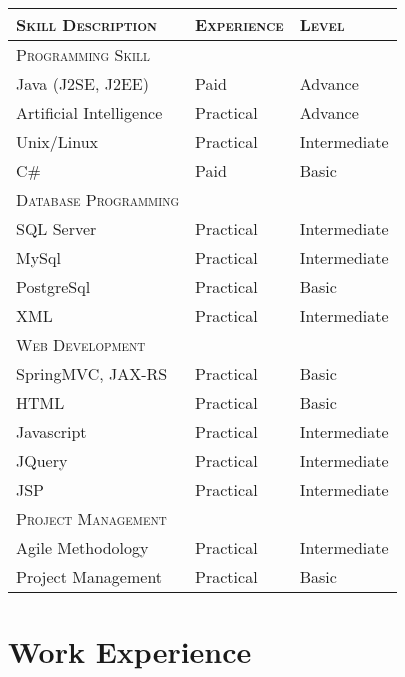 \documentclass[a4paper,10pt]{article} %
\begin{document}
    \begin{tabular}{l|l|l}
   
    \textsc{Skill Description} & \textsc{Experience}  & \textsc{Level} \\ \hline
    \textsc{Programming Skill}\\ \hline
    Java (J2SE, J2EE) & Paid & Advance \\
    Artificial Intelligence & Practical & Advance \\ 
    Unix/Linux & Practical & Intermediate \\ 
    C\# & Paid & Basic \\   
    \textsc{Database Programming} \\ \hline
    SQL Server & Practical & Intermediate \\ 
    MySql & Practical & Intermediate \\ 
    PostgreSql & Practical & Basic \\ 
    XML & Practical & Intermediate \\ \hline
    \textsc{Web Development} \\ \hline
    SpringMVC, JAX-RS & Practical & Basic \\ 
    HTML & Practical & Basic \\ 
    Javascript & Practical & Intermediate \\ 
    JQuery & Practical & Intermediate \\ 
    JSP & Practical & Intermediate \\ \hline
    \textsc{Project Management}\\ \hline
    Agile Methodology & Practical & Intermediate \\ 
    Project Management & Practical & Basic \\ \hline
    \end{tabular}





\section{Work Experience}
\end{document}
